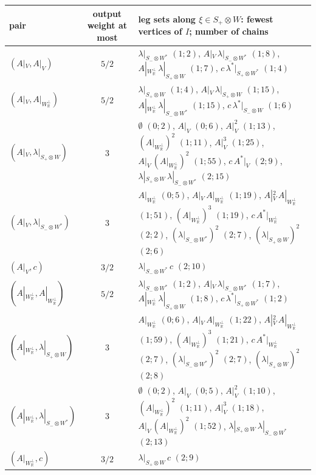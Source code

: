 \begin{tabular}{l|c|l}
pair & output weight at most & leg sets along $\xi\in S_+\otimes W$: fewest vertices of $I$; number of chains\\
\hline
$(A|_V,A|_V)$ & $5/2$ & $\lambda|_{S_-\otimes W^*}$ $(1;2)$, $A|_V\,\lambda|_{S_-\otimes W^*}$ $(1;8)$, $A|_{W_{\mathbb R}^\perp}\,\lambda|_{S_+\otimes W}$ $(1;7)$, $c\,\lambda^*|_{S_+\otimes W^*}$ $(1;4)$\\
$(A|_V,A|_{W_{\mathbb R}^\perp})$ & $5/2$ & $\lambda|_{S_+\otimes W}$ $(1;4)$, $A|_V\,\lambda|_{S_+\otimes W}$ $(1;15)$, $A|_{W_{\mathbb R}^\perp}\,\lambda|_{S_-\otimes W^*}$ $(1;15)$, $c\,\lambda^*|_{S_-\otimes W}$ $(1;6)$\\
$(A|_V,\lambda|_{S_+\otimes W})$ & $3$ & $\emptyset$ $(0;2)$, $A|_V$ $(0;6)$, $A|_V^2$ $(1;13)$, $(A|_{W_{\mathbb R}^\perp})^2$ $(1;11)$, $A|_V^3$ $(1;25)$, $A|_V\,(A|_{W_{\mathbb R}^\perp})^2$ $(1;55)$, $c\,A^*|_V$ $(2;9)$, $\lambda|_{S_+\otimes W}\,\lambda|_{S_-\otimes W^*}$ $(2;15)$\\
$(A|_V,\lambda|_{S_-\otimes W^*})$ & $3$ & $A|_{W_{\mathbb R}^\perp}$ $(0;5)$, $A|_V\,A|_{W_{\mathbb R}^\perp}$ $(1;19)$, $A|_V^2\,A|_{W_{\mathbb R}^\perp}$ $(1;51)$, $(A|_{W_{\mathbb R}^\perp})^3$ $(1;19)$, $c\,A^*|_{W_{\mathbb R}^\perp}$ $(2;2)$, $(\lambda|_{S_-\otimes W^*})^2$ $(2;7)$, $(\lambda|_{S_+\otimes W})^2$ $(2;6)$\\
$(A|_V,c)$ & $3/2$ & $\lambda|_{S_-\otimes W^*}\,c$ $(2;10)$\\
$(A|_{W_{\mathbb R}^\perp},A|_{W_{\mathbb R}^\perp})$ & $5/2$ & $\lambda|_{S_-\otimes W^*}$ $(1;2)$, $A|_V\,\lambda|_{S_-\otimes W^*}$ $(1;7)$, $A|_{W_{\mathbb R}^\perp}\,\lambda|_{S_+\otimes W}$ $(1;8)$, $c\,\lambda^*|_{S_+\otimes W^*}$ $(1;2)$\\
$(A|_{W_{\mathbb R}^\perp},\lambda|_{S_+\otimes W})$ & $3$ & $A|_{W_{\mathbb R}^\perp}$ $(0;6)$, $A|_V\,A|_{W_{\mathbb R}^\perp}$ $(1;22)$, $A|_V^2\,A|_{W_{\mathbb R}^\perp}$ $(1;59)$, $(A|_{W_{\mathbb R}^\perp})^3$ $(1;21)$, $c\,A^*|_{W_{\mathbb R}^\perp}$ $(2;7)$, $(\lambda|_{S_-\otimes W^*})^2$ $(2;7)$, $(\lambda|_{S_+\otimes W})^2$ $(2;8)$\\
$(A|_{W_{\mathbb R}^\perp},\lambda|_{S_-\otimes W^*})$ & $3$ & $\emptyset$ $(0;2)$, $A|_V$ $(0;5)$, $A|_V^2$ $(1;10)$, $(A|_{W_{\mathbb R}^\perp})^2$ $(1;11)$, $A|_V^3$ $(1;18)$, $A|_V\,(A|_{W_{\mathbb R}^\perp})^2$ $(1;52)$, $\lambda|_{S_+\otimes W}\,\lambda|_{S_-\otimes W^*}$ $(2;13)$\\
$(A|_{W_{\mathbb R}^\perp},c)$ & $3/2$ & $\lambda|_{S_+\otimes W}\,c$ $(2;9)$\\

\end{tabular}

